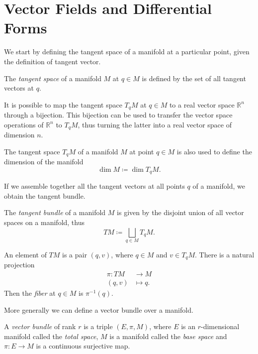 \section{Vector Fields and Differential Forms}
\label{sec:sec1}

We start by defining the tangent space of a manifold at a particular point, given the definition of tangent vector.

\begin{definition}
    The \emph{tangent space} of a manifold $M$ at $q \in M$ is defined by the set of all tangent vectors at $q$.
\end{definition}

It is possible to map the tangent space $T_q M$ at $q \in M$ to a real vector space $\mathbb{R}^n$ through a bijection.
This bijection can be used to transfer the vector space operations of $\mathbb{R}^n$ to $T_q M$, thus turning the latter into a real vector space of dimension $n$.

The tangent space $T_q M$ of a manifold $M$ at point $q \in M$ is also used to define the dimension of the manifold 
\begin{equation*}
    \dim M \coloneqq \dim T_q M .
\end{equation*}

If we assemble together all the tangent vectors at all points $q$ of a manifold, we obtain the tangent bundle.

\begin{definition}
    The \emph{tangent bundle} of a manifold $M$ is given by the disjoint union of all vector spaces on a manifold, thus
    \begin{equation*}
        TM \coloneqq \bigsqcup _{q \in M} T_q M .
    \end{equation*}
\end{definition}

An element of $TM$ is a pair $(q, v)$, where $q \in M$ and $v \in T_q M$.
There is a natural projection
\begin{align*}
    \pi : TM &\rightarrow M \\
    (q, v) &\mapsto q .
\end{align*}
Then the \emph{fiber} at $q \in M$ is $\pi ^{-1} (q)$.

More generally we can define a vector bundle over a manifold.

\begin{definition}
    A \emph{vector bundle} of rank $r$ is a triple $(E, \pi, M)$, where $E$ is an $r$-dimensional manifold called the \emph{total space}, $M$ is a manifold called the \emph{base space} and $\pi : E \rightarrow M$ is a continuous surjective map.
\end{definition}

